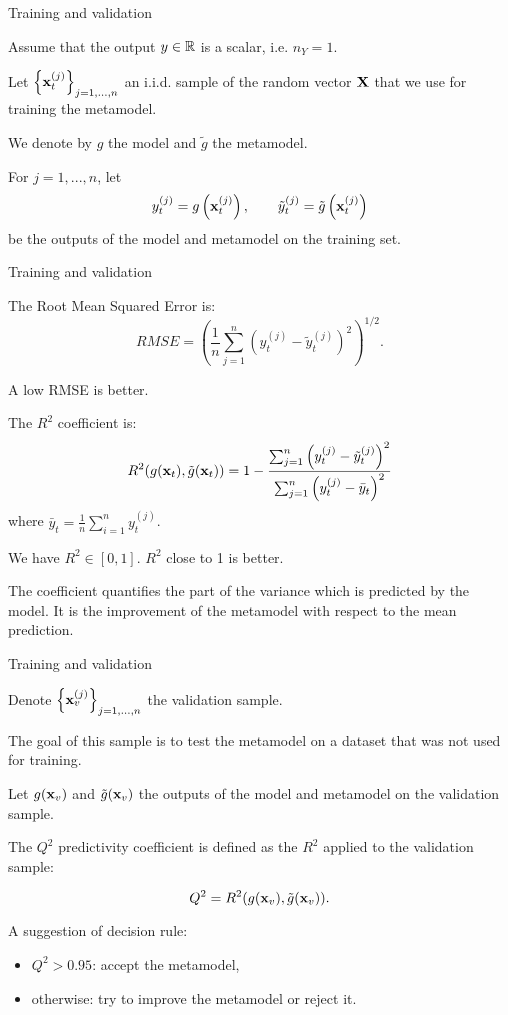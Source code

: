 \documentclass{beamer}
\begin{document}

\begin{frame}[t]{Training and validation}

Assume that the output $y\in\mathbb{R}$ is a scalar, i.e. $n_Y = 1$. 

Let $\left\{{\bf x}^{(j)}_t\right\}_{j=1,...,n}$ an i.i.d. sample 
of the random vector ${\bf X}$ that we use for training the 
metamodel. 

We denote by $g$ the model and $\tilde{g}$ the metamodel. 

For $j=1,...,n$, let 
$$
y^{(j)}_t = g\left({\bf x}^{(j)}_t\right), \qquad 
\tilde{y}^{(j)}_t = \tilde{g}\left({\bf x}^{(j)}_t\right)
$$
 be the outputs of the model and metamodel 
on the training set.
\end{frame}


\begin{frame}[t]{Training and validation}

The Root Mean Squared Error is: 
$$
RMSE
= \left( \frac{1}{n} \sum_{j=1}^n \left( y^{(j)}_t - \tilde{y}^{(j)}_t \right)^2 \right)^{1/2}.
$$

A low RMSE is better. 

The $R^2$ coefficient is: 
$$
R^2(g({\bf x}_t),\tilde{g}({\bf x}_t)) 
= 1 - \frac{ \sum_{j=1}^n \left( y^{(j)}_t - \tilde{y}^{(j)}_t \right)^2}
{ \sum_{j=1}^n \left( y^{(j)}_t - \bar{y}_t \right)^2 }
$$
where $\bar{y}_t = \frac{1}{n} \sum_{i=1}^n y^{(j)}_t$. 

We have $R^2 \in[0,1]$. $R^2$ close to 1 is better. 

The coefficient quantifies the part of the variance which is predicted by the 
model. It is the improvement of the metamodel with respect to the 
mean prediction. 

\end{frame}


\begin{frame}[t]{Training and validation}

Denote $\left\{{\bf x}^{(j)}_v\right\}_{j=1,...,n}$ the 
validation sample. 

The goal of this sample is to test the metamodel on a dataset 
that was not used for training.

Let $g({\bf x}_v)$ and $\tilde{g}({\bf x}_v)$ the outputs of the 
model and metamodel on the validation sample.

The $Q^2$ predictivity coefficient is defined as the $R^2$ 
applied to the validation sample:

$$
Q^2 = R^2(g({\bf x}_v),\tilde{g}({\bf x}_v)).
$$

A suggestion of decision rule:
\begin{itemize}
\item $Q^2>0.95$: accept the metamodel,
\item otherwise: try to improve the metamodel or reject it.
\end{itemize}

\end{frame}
\end{document}
